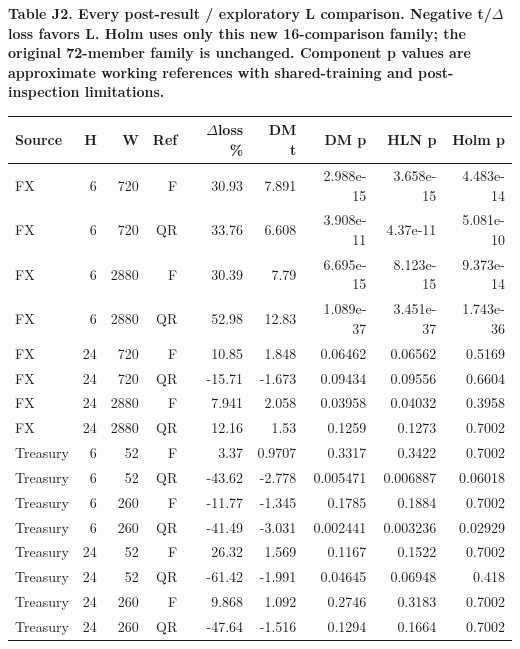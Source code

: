 \documentclass[10pt,a4paper]{article}
\begin{document}
\begin{center}
\begin{minipage}{\linewidth}
\small\textbf{Table J2. Every post-result / exploratory L comparison. Negative t/\(\Delta\)loss favors L. Holm uses only this new 16-comparison family; the original 72-member family is unchanged. Component p values are approximate working references with shared-training and post-inspection limitations.}\par\medskip
\centering\fontsize{8}{10}\selectfont
\begin{tabular}{lrrrrrrrr}
\toprule
Source & H & W & Ref & \(\Delta\)loss \% & DM t & DM p & HLN p & Holm p \\
\midrule
FX & 6 & 720 & F & 30.93 & 7.891 & 2.988e-15 & 3.658e-15 & 4.483e-14 \\
FX & 6 & 720 & QR & 33.76 & 6.608 & 3.908e-11 & 4.37e-11 & 5.081e-10 \\
FX & 6 & 2880 & F & 30.39 & 7.79 & 6.695e-15 & 8.123e-15 & 9.373e-14 \\
FX & 6 & 2880 & QR & 52.98 & 12.83 & 1.089e-37 & 3.451e-37 & 1.743e-36 \\
FX & 24 & 720 & F & 10.85 & 1.848 & 0.06462 & 0.06562 & 0.5169 \\
FX & 24 & 720 & QR & -15.71 & -1.673 & 0.09434 & 0.09556 & 0.6604 \\
FX & 24 & 2880 & F & 7.941 & 2.058 & 0.03958 & 0.04032 & 0.3958 \\
FX & 24 & 2880 & QR & 12.16 & 1.53 & 0.1259 & 0.1273 & 0.7002 \\
Treasury & 6 & 52 & F & 3.37 & 0.9707 & 0.3317 & 0.3422 & 0.7002 \\
Treasury & 6 & 52 & QR & -43.62 & -2.778 & 0.005471 & 0.006887 & 0.06018 \\
Treasury & 6 & 260 & F & -11.77 & -1.345 & 0.1785 & 0.1884 & 0.7002 \\
Treasury & 6 & 260 & QR & -41.49 & -3.031 & 0.002441 & 0.003236 & 0.02929 \\
Treasury & 24 & 52 & F & 26.32 & 1.569 & 0.1167 & 0.1522 & 0.7002 \\
Treasury & 24 & 52 & QR & -61.42 & -1.991 & 0.04645 & 0.06948 & 0.418 \\
Treasury & 24 & 260 & F & 9.868 & 1.092 & 0.2746 & 0.3183 & 0.7002 \\
Treasury & 24 & 260 & QR & -47.64 & -1.516 & 0.1294 & 0.1664 & 0.7002 \\
\bottomrule
\end{tabular}
\end{minipage}
\end{center}
\end{document}
